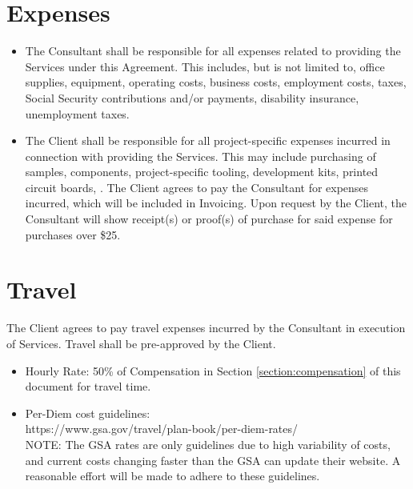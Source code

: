 \documentclass{article}
\begin{document}
\section{Expenses}
\begin{itemize}
    \item The Consultant shall be responsible for all expenses related to providing the Services under this Agreement. This includes, but is not limited to, office supplies, equipment, operating costs, business costs, employment costs, taxes, Social Security contributions and/or payments, disability insurance, unemployment taxes.
    \item The Client shall be responsible for all project-specific expenses incurred in connection with providing the Services.  This may include purchasing of samples, components, project-specific tooling, development kits, printed circuit boards, .  The Client agrees to pay the Consultant for expenses incurred, which will be included in Invoicing. Upon request by the Client, the Consultant will show receipt(s) or proof(s) of purchase for said expense for purchases over \$25. 
\end{itemize}

\section{Travel}
The Client agrees to pay travel expenses incurred by the Consultant in execution of Services.  Travel shall be pre-approved by the Client.  
\begin{itemize}
    \item Hourly Rate: 50\% of Compensation in Section \ref{section:compensation} of this document for travel time.
    \item Per-Diem cost guidelines: \\ https://www.gsa.gov/travel/plan-book/per-diem-rates/ \\ NOTE: The GSA rates are only guidelines due to high variability of costs, and current costs changing faster than the GSA can update their website.  A reasonable effort will be made to adhere to these guidelines.  
\end{itemize}
\end{document}

